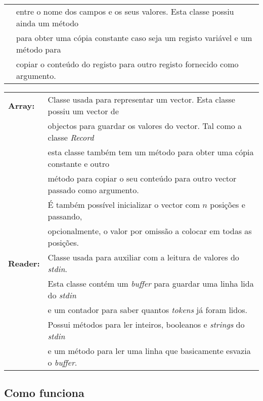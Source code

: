 {\begin{tabular}{ll}
					&entre o nome dos campos e os seus valores. Esta classe possiu ainda um método \\
					&para obter uma cópia constante caso seja um registo variável e um método para \\
					&copiar o conteúdo do registo para outro registo fornecido como argumento.\\
\end{tabular}
\newpage
\begin{tabular}{ll}
\textbf{Array:}		&Classe usada para representar um vector. Esta classe possiu um vector de \\
					&objectos para guardar os valores do vector. Tal como a classe \emph{Record} \\
					&esta classe também tem um método para obter uma cópia constante e outro \\
					&método para copiar o seu conteúdo para outro vector passado como argumento. \\
					&É também possível inicializar o vector com $n$ posições e passando, \\
					&opcionalmente, o valor por omissão a colocar em todas as posições.\\
\hline
\textbf{Reader:}	&Classe usada para auxiliar com a leitura de valores do \emph{stdin}. \\
					&Esta classe contém um \emph{buffer} para guardar uma linha lida do \emph{stdin} \\
					&e um contador para saber quantos \emph{tokens} já foram lidos. \\
					&Possui métodos para ler inteiros, booleanos e \emph{strings} do \emph{stdin} \\
					& e um método para ler uma linha que basicamente esvazia o \emph{buffer}.\\
\end{tabular}
}

\subsection{Como funciona}


